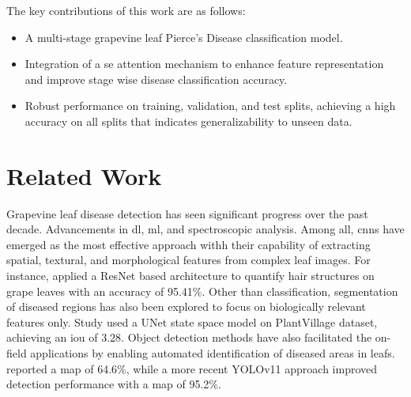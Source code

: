 \documentclass[conference]{IEEEtran}
\begin{document}
The key contributions of this work are as follows:
\begin{itemize}
    \item A multi-stage grapevine leaf Pierce's Disease classification model.
    \item Integration of a \ac{se} attention mechanism to enhance feature representation and improve stage wise disease classification accuracy.
    \item Robust performance on training, validation, and test splits, achieving a high accuracy on all splits that indicates generalizability to unseen data.
\end{itemize}



\section{Related Work}
\label{sec:rw}
Grapevine leaf disease detection has seen significant progress over the past decade. Advancements in \ac{dl}, \ac{ml}, and spectroscopic analysis. Among all, \ac{cnn}s have emerged as the most effective approach withh their capability of extracting spatial, textural, and morphological features from complex leaf images. For instance, \cite{Malagol2025} applied a ResNet based architecture to quantify hair structures on grape leaves with an accuracy of 95.41\%. Other than classification, segmentation of diseased regions has also been explored to focus on biologically relevant features only. Study \cite{Zhang2024GMamba} used a UNet state space model on PlantVillage dataset, achieving an \ac{iou} of 3.28. Object detection methods have also facilitated the on-field applications by enabling automated identification of diseased areas in leafs. \cite{Khan2025YOLOv7} reported a \ac{map} of 64.6\%, while a more recent YOLOv11 approach \cite{Zhou2025YOLOGrape} improved detection performance with a \ac{map} of 95.2\%.
\end{document}
